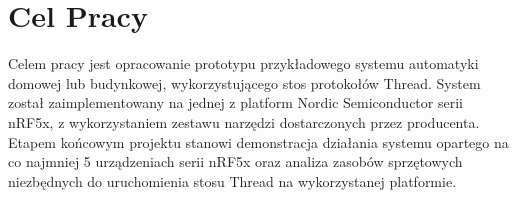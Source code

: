 \section*{Cel Pracy}
\label{cha:cel}

Celem pracy jest opracowanie prototypu przykładowego systemu automatyki domowej lub budynkowej, wykorzystującego stos protokołów Thread. System został zaimplementowany na jednej z platform Nordic Semiconductor serii nRF5x, z wykorzystaniem zestawu narzędzi dostarczonych przez producenta. Etapem końcowym projektu stanowi demonstracja działania systemu opartego na co najmniej 5 urządzeniach serii nRF5x oraz analiza zasobów sprzętowych niezbędnych do uruchomienia stosu Thread na wykorzystanej platformie.
